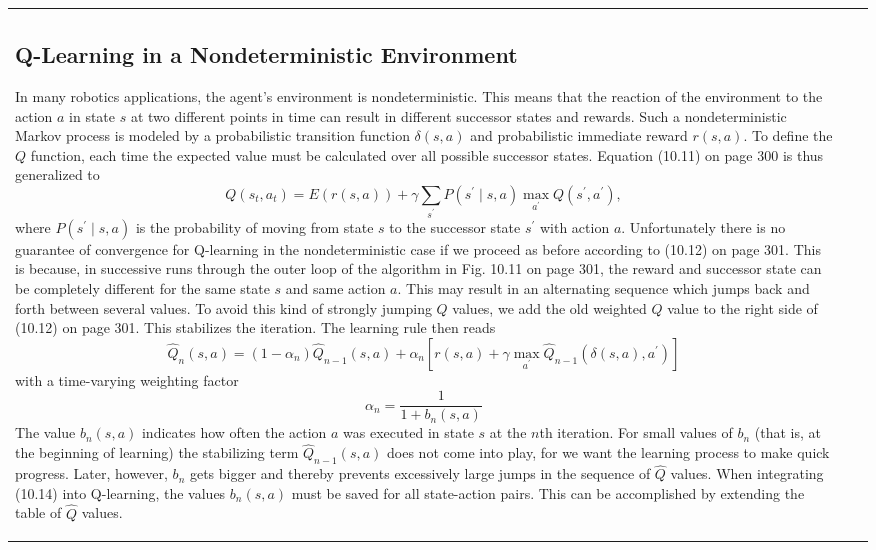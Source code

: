 \documentclass[10pt]{book}
\begin{document}
\begin{center}
\begin{tabular}{|l|l|l|}
\subsection{Q-Learning in a Nondeterministic Environment}
In many robotics applications, the agent's environment is nondeterministic. This means that the reaction of the environment to the action $a$ in state $s$ at two different points in time can result in different successor states and rewards. Such a nondeterministic Markov process is modeled by a probabilistic transition function $\delta(s, a)$ and probabilistic immediate reward $r(s, a)$. To define the $Q$ function, each time the expected value must be calculated over all possible successor states. Equation (10.11) on page 300 is thus generalized to
\begin{equation*}
Q\left(s_{t}, a_{t}\right)=E(r(s, a))+\gamma \sum_{s^{\prime}} P\left(s^{\prime} \mid s, a\right) \max _{a^{\prime}} Q\left(s^{\prime}, a^{\prime}\right), \tag{10.13}
\end{equation*}
where $P\left(s^{\prime} \mid s, a\right)$ is the probability of moving from state $s$ to the successor state $s^{\prime}$ with action $a$. Unfortunately there is no guarantee of convergence for Q-learning in the nondeterministic case if we proceed as before according to (10.12) on page 301. This is because, in successive runs through the outer loop of the algorithm in Fig. 10.11 on page 301, the reward and successor state can be completely different for the same state $s$ and same action $a$. This may result in an alternating sequence which jumps back and forth between several values. To avoid this kind of strongly jumping $Q$ values, we add the old weighted $Q$ value to the right side of (10.12) on page 301. This stabilizes the iteration. The learning rule then reads
\begin{equation*}
\hat{Q}_{n}(s, a)=\left(1-\alpha_{n}\right) \hat{Q}_{n-1}(s, a)+\alpha_{n}\left[r(s, a)+\gamma \max _{a^{\prime}} \hat{Q}_{n-1}\left(\delta(s, a), a^{\prime}\right)\right] \tag{10.14}
\end{equation*}
with a time-varying weighting factor
$$
\alpha_{n}=\frac{1}{1+b_{n}(s, a)}
$$
The value $b_{n}(s, a)$ indicates how often the action $a$ was executed in state $s$ at the $n$th iteration. For small values of $b_{n}$ (that is, at the beginning of learning) the stabilizing term $\hat{Q}_{n-1}(s, a)$ does not come into play, for we want the learning process to make quick progress. Later, however, $b_{n}$ gets bigger and thereby prevents excessively large jumps in the sequence of $\hat{Q}$ values. When integrating (10.14) into Q-learning, the values $b_{n}(s, a)$ must be saved for all state-action pairs. This can be accomplished by extending the table of $\hat{Q}$ values.


\end{tabular}
\end{center}
\end{document}
